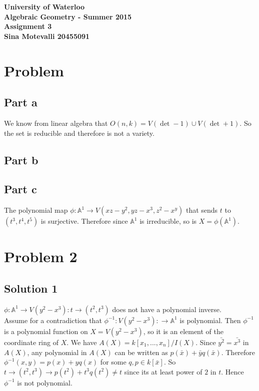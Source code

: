 \documentclass[12pt]{article}
\begin{document}
\begin{center}
  {\Large\bf University of Waterloo}\\
  \vspace{3mm}
         {\Large\bf Algebraic Geometry - Summer 2015}\\
         \vspace{2mm}
                {\Large\bf Assignment 3}\\
                \vspace{3mm}
                \textbf{Sina Motevalli 20455091}
\end{center}
\section*{Problem}
\subsection*{Part a}
We know from linear algebra that
$O(n,k)=V(\det -1) \cup V(\det +1)$. So the set is reducible and therefore is not a variety. 
\subsection*{Part b}

\subsection*{Part c}
The polynomial map
$\phi: \mathbb{A}^1 \rightarrow V(xz-y^2,yz-x^3,z^2-x^y)$ that sends $t$ to $(t^3,t^4,t^5)$ is surjective. Therefore since $\mathbb{A}^1$ is irreducible, so is $X=\phi(\mathbb{A}^1)$.


\clearpage
\section*{Problem 2}
\subsection*{Solution 1}
$\phi: \mathbb{A}^1 \rightarrow V(y^2-x^3) : t \rightarrow (t^2,t^3)$ does not have a polynomial inverse. \\
Assume for a contradiction that $\phi^{-1}: V(y^2-x^3): \rightarrow \mathbb{A}^1$ is polynomial.
Then $\phi^{-1}$ is a polynomial function on $X=V(y^2-x^3)$, so it is an element of the coordinate ring of $X$.
We have $A(X)=k[x_1,...,x_n]/I(X)$. Since
$\bar{y^2}=\bar{x^3}$ in $A(X)$, any polynomial in $A(X)$ can be written as $p(\bar{x})+\bar{y}q(\bar{x})$.
Therefore $\phi^{-1} (x,y)=p(x)+yq(x)$ for some $q,p \in k[\bar{x}]$.
So $t \rightarrow (t^2,t^3) \rightarrow p(t^2) + t^3 q(t^2) \not=t$ since its at least power of $2$ in $t$. Hence $\phi^{-1}$ is not polynomial.
\end{document}
